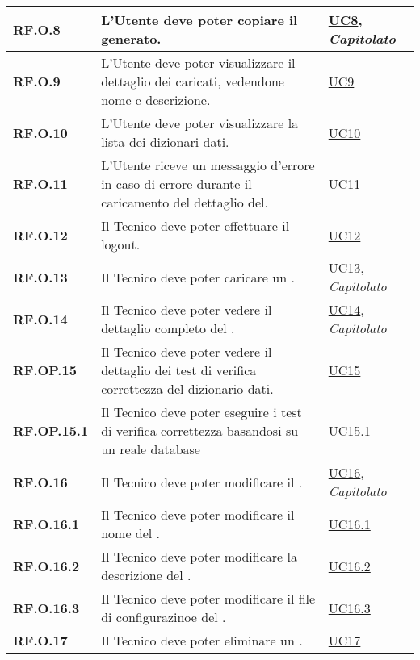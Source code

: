 \begin{longtable}{|P{3cm}|P{6,5cm}|>{\arraybackslash}P{4cm}|}
    \hline
    \textbf{RF.O.8} & L’Utente  deve poter copiare il  generato. &  \hyperref[UC8]{UC8}, \emph{Capitolato}\\
    \hline
    \textbf{RF.O.9} & L’Utente  deve poter visualizzare il dettaglio dei  caricati, vedendone nome e descrizione. &  \hyperref[UC9]{UC9}\\
    \hline
    \textbf{RF.O.10} & L’Utente  deve poter visualizzare la lista dei dizionari dati. &  \hyperref[UC10]{UC10}\\
    \hline
    \textbf{RF.O.11} & L’Utente  riceve un messaggio d'errore in caso di errore durante il caricamento del dettaglio del. &  \hyperref[UC11]{UC11}\\
    \hline
    \textbf{RF.O.12} & Il Tecnico deve poter effettuare il logout. &  \hyperref[UC12]{UC12}\\
    \hline
    \textbf{RF.O.13} & Il Tecnico deve poter caricare un . &  \hyperref[UC13]{UC13}, \emph{Capitolato}\\
    \hline
    \textbf{RF.O.14} & Il Tecnico deve poter vedere il dettaglio completo del . &  \hyperref[UC14]{UC14}, \emph{Capitolato}\\
    \hline
    \textbf{RF.OP.15} & Il Tecnico deve poter vedere il dettaglio dei test di verifica correttezza del dizionario dati. &  \hyperref[UC15]{UC15}\\
    \hline
    \textbf{RF.OP.15.1} & Il Tecnico deve poter eseguire i test di verifica correttezza basandosi su un reale database &  \hyperref[UC15point1]{UC15.1}\\
    \hline
    \textbf{RF.O.16} & Il Tecnico deve poter modificare il . &  \hyperref[UC16]{UC16}, \emph{Capitolato}\\
    \hline
    \textbf{RF.O.16.1} & Il Tecnico deve poter modificare il nome del . &  \hyperref[UC16point1]{UC16.1}\\
    \hline
    \textbf{RF.O.16.2} & Il Tecnico deve poter modificare la descrizione del . &  \hyperref[UC16point2]{UC16.2}\\
    \hline
    \textbf{RF.O.16.3} & Il Tecnico deve poter modificare il file di configurazinoe del . &  \hyperref[UC16point3]{UC16.3}\\
    \hline
    \textbf{RF.O.17} & Il Tecnico deve poter eliminare un . &  \hyperref[UC17]{UC17}\\

\end{longtable}
